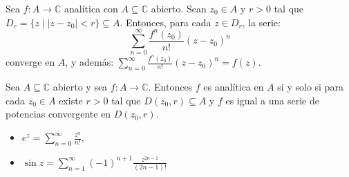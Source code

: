 \documentclass[spanish,presentation]{beamer}
\begin{document}
\begin{frame}[label=sec-3-1]{}
\begin{theorem}[Taylor]
Sea \(f\colon A\to \mathbb{C}\) analítica con \(A\subseteq
    \mathbb{C}\) abierto. Sean \(z_{0}\in A\) y \(r>0\) tal que
\(D_{r}=\{z\mid |z-z_{0}|<r\}\subseteq A\). Entonces, para cada
\(z\in D_{r}\), la serie:
\begin{displaymath}
\sum_{n=0}^{\infty} \frac{f^{n}(z_{0})}{n!}(z-z_{0})^{n}
\end{displaymath}
converge en \(A\), y además: \(\sum_{n=0}^{\infty}
    \frac{f^{n}(z_{0})}{n!}(z-z_{0})^{n}=f(z)\).
\end{theorem}
\end{frame}

\begin{frame}[label=sec-3-2]{}
\begin{corollary}
Sea \(A\subseteq \mathbb{C}\) abierto y sea \(f\colon A\to
    \mathbb{C}\). Entonces \(f\) es analítica en \(A\) si y solo si
para cada \(z_{0}\in A\) existe \(r>0\) tal que
\(D(z_{0},r)\subseteq A\) y \(f\) es igual a una serie de
potencias convergente en \(D(z_{0},r)\).
\end{corollary}

\begin{block}{}
\begin{itemize}
\item \(e^{z}=\sum_{n=0}^{\infty}\frac{z^{n}}{n!}\),
\item \(\sin z=\sum_{n=1}^{\infty}(-1)^{n+1}\frac{z^{2n-1}}{(2n-1)!}\)
\end{itemize}
\end{block}
\end{frame}
\end{document}

